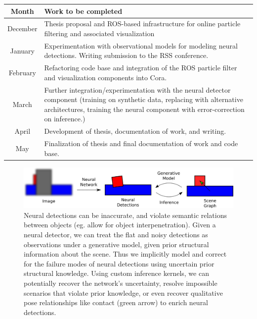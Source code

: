   \begin{table}[h]
    \begin{tabularx}{\textwidth}{|c|X|}
      \hline
      \textbf{Month} & \textbf{Work to be completed} \\
      \hline
      December & Thesis proposal and ROS-based infrastructure for online particle filtering and associated visualization \\
      \hline
      January  & Experimentation with observational models for modeling neural detections. Writing submission to the RSS conference. \\
      \hline
      February & Refactoring code base and integration of the ROS particle filter and visualization components into Cora. \\
      \hline
      March    & Further integration/experimentation with the neural detector component (training on synthetic data, replacing with alternative architectures, training the neural component with error-correction on inference.) \\
      \hline
      April    & Development of thesis, documentation of work, and writing. \\
      \hline
      May      & Finalization of thesis and final documentation of work and code base. \\
      \hline
    \end{tabularx}
  \end{table}

  \begin{figure}
    \centering
    \includegraphics[width=\textwidth]{figures/neural-model.png}
    \caption{\small
      Neural detections can be inaccurate, and violate semantic relations
      between objects (eg. allow for object interpenetration). Given a neural
      detector, we can treat the flat and noisy detections as observations
      under a generative model, given prior structural information about the
      scene. Thus we implicitly model and correct for the failure modes of
      neural detections using uncertain prior structural knowledge. Using
      custom inference kernels, we can potentially recover the network's
      uncertainty, resolve impossible scenarios that violate prior knowledge,
      or even recover qualitative pose relationships like contact (green arrow)
      to enrich neural detections.
    }
    \label{fig:neural-model}
  \end{figure}
  

